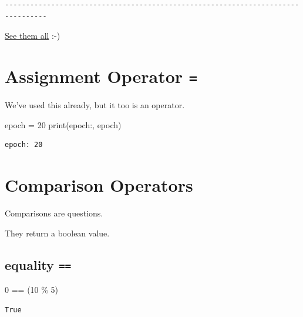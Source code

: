 \documentclass[
  letterpaper,
  DIV=11,
  numbers=noendperiod]{scrreprt}
\newenvironment{Shaded}{\begin{snugshade}}{\end{snugshade}}
\newcommand{\BuiltInTok}[1]{\textcolor[rgb]{0.00,0.23,0.31}{#1}}
\newcommand{\DecValTok}[1]{\textcolor[rgb]{0.68,0.00,0.00}{#1}}
\newcommand{\NormalTok}[1]{\textcolor[rgb]{0.00,0.23,0.31}{#1}}
\newcommand{\OperatorTok}[1]{\textcolor[rgb]{0.37,0.37,0.37}{#1}}
\newcommand{\StringTok}[1]{\textcolor[rgb]{0.13,0.47,0.30}{#1}}
\begin{document}
\begin{verbatim}
--------------------------------------------------------------------------------
\end{verbatim}

\href{https://simpsonswiki.com/wiki/List_of_chalkboard_gags}{See them
all} :-)

\hypertarget{assignment-operator}{%
\section{\texorpdfstring{Assignment Operator
\texttt{=}}{Assignment Operator =}}\label{assignment-operator}}

We've used this already, but it too is an operator.

\begin{Shaded}
\begin{Highlighting}[]
\NormalTok{epoch }\OperatorTok{=} \DecValTok{20}
\BuiltInTok{print}\NormalTok{(}\StringTok{\textquotesingle{}epoch:\textquotesingle{}}\NormalTok{, epoch)}
\end{Highlighting}
\end{Shaded}

\begin{verbatim}
epoch: 20
\end{verbatim}

\hypertarget{comparison-operators}{%
\section{Comparison Operators}\label{comparison-operators}}

Comparisons are questions.

They return a boolean value.

\hypertarget{equality}{%
\subsection{\texorpdfstring{equality
\texttt{==}}{equality ==}}\label{equality}}

\begin{Shaded}
\begin{Highlighting}[]
\DecValTok{0} \OperatorTok{==}\NormalTok{ (}\DecValTok{10} \OperatorTok{\%} \DecValTok{5}\NormalTok{)}
\end{Highlighting}
\end{Shaded}

\begin{verbatim}
True
\end{verbatim}
\end{document}
